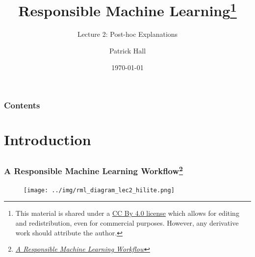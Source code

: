 \documentclass[11pt,aspectratio=169,hyperref={colorlinks}]{beamer}
\author{Patrick Hall}
\title{Responsible Machine Learning\footnote{\tiny{This material is shared under a \href{https://creativecommons.org/licenses/by/4.0/deed.ast}{CC By 4.0 license} which allows for editing and redistribution, even for commercial purposes. However, any derivative work should attribute the author.}}}
\subtitle{Lecture 2:  Post-hoc Explanations}
\institute{The George Washington University}
\date{\today}
\renewcommand*{\thefootnote}{\fnsymbol{footnote}}
\renewcommand*{\thefootnote}{\fnsymbol{footnote}}
\begin{document}
	
	\maketitle
	
	\begin{frame}
	
		\frametitle{Contents}
		
		\tableofcontents{}
		
	\end{frame}

\renewcommand*{\thefootnote}{\arabic{footnote}}

	\section{Introduction}

	
		\subsection*{} %
			
		\begin{frame}
		
			\frametitle{A Responsible Machine Learning Workflow\footnote{\href{https://www.mdpi.com/2078-2489/11/3/137/htm}{\textit{A Responsible Machine Learning Workflow}}}}
			
			\begin{figure}[htb]
				\begin{center}
					\texttt{[image: ../img/rml\_diagram\_lec2\_hilite.png]}
					\label{fig:blueprint}
				\end{center}
			\end{figure}		
					
		\end{frame}					
\end{document}
